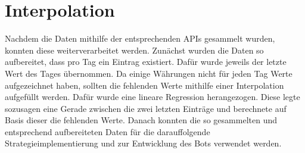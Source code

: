 \section{Interpolation}

Nachdem die Daten mithilfe der entsprechenden APIs gesammelt wurden, konnten diese weiterverarbeitet werden. Zunächst wurden die Daten so aufbereitet, dass pro Tag ein Eintrag existiert. Dafür wurde jeweils der letzte Wert des Tages übernommen. Da einige Währungen nicht für jeden Tag Werte aufgezeichnet haben, sollten die fehlenden Werte mithilfe einer Interpolation aufgefüllt werden. Dafür wurde eine lineare Regression herangezogen. Diese legte sozusagen eine Gerade zwischen die zwei letzten Einträge und berechnete auf Basis dieser die fehlenden Werte.  Danach konnten die so gesammelten und entsprechend aufbereiteten Daten für die darauffolgende Strategieimplementierung und zur Entwicklung des Bots verwendet werden.